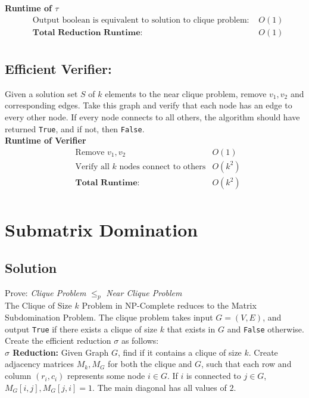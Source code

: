 \documentclass[11pt]{article}
\begin{document}
\textbf{Runtime of $\tau$ }
\begin{align*}
&\text{Output boolean is equivalent to solution to clique problem: } &O(1)\\ 
&\textbf{Total Reduction Runtime: } &O(1)\\
\end{align*}

\subsection{Efficient Verifier:}
Given a solution set $S$ of $k$ elements to the near clique problem, remove $v_1,v_2$ and corresponding edges. Take this graph and verify that each node has an edge to every other node. If every node connects to all others, the algorithm should have returned \texttt{True}, and if not, then \texttt{False}. \\

\textbf{Runtime of Verifier }
\begin{align*}
&\text{Remove $v_1,v_2$}&O(1)\\
&\text{Verify all $k$ nodes connect to others} &O(k^2)\\ 
&\textbf{Total Runtime: } &O(k^2)\\
\end{align*}

\lobsectionbreak

\section{Submatrix Domination}
\BgThispage

\subsection{Solution}

Prove: \textit{Clique Problem} $\leq_p$ \textit{Near Clique Problem}\\

The Clique of Size $k$ Problem in NP-Complete reduces to the Matrix Subdomination Problem. The  clique problem takes input $G = (V,E)$, and output \texttt{True} if there exists a clique of size $k$ that exists in $G$ and \texttt{False} otherwise. Create the efficient reduction $\sigma$ as follows: \\

\textbf{$\sigma$ Reduction:}
Given Graph $G$, find if it contains a clique of size $k$. Create adjacency matrices $M_k, M_G$ for both the clique and $G$, such that each row and column $(r_i,c_i)$ represents some node $i \in G$. If $i$ is connected to $j \in G$, $M_G[i,j],M_G[j,i] = 1$. The main diagonal has all values of $2$.  \\
\end{document}
